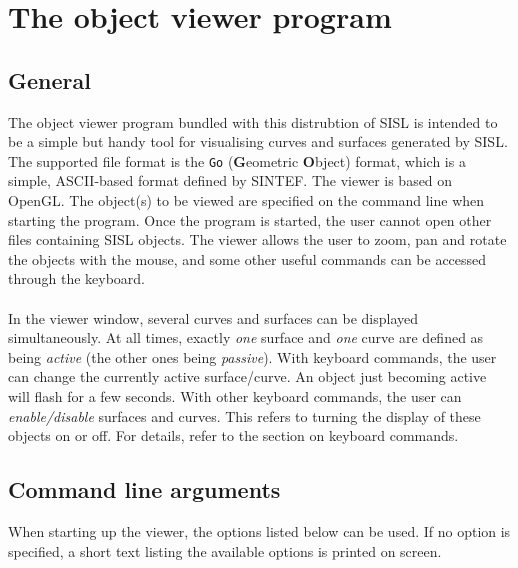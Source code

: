 \chapter{The object viewer program}

\section{General}
The object viewer program bundled with this distrubtion of SISL is intended to be
a simple but handy tool for visualising curves and surfaces generated by SISL.  The
supported file format is the \verb/Go/ (\textbf{G}eometric \textbf{O}bject) format, 
which is a simple, ASCII-based format defined by SINTEF.  The viewer is based on OpenGL. 
The object(s) to be viewed are specified on the command line when starting the 
program.  Once the program is started, the user cannot open other files containing
SISL objects.  The viewer allows the user to zoom, pan and rotate the objects with
the mouse, and some other useful commands can be accessed through the keyboard.
\\
\\
In the viewer window, several curves and surfaces can be displayed simultaneously.
At all times, exactly \emph{one} surface and \emph{one} curve are defined as being
\emph{active} (the other ones being \emph{passive}).  With keyboard commands, the user
can change the currently active surface/curve.  An object just becoming active will
flash for a few seconds.  With other keyboard commands, the user can \emph{enable/disable}
surfaces and curves.  This refers to turning the display of these objects on or off.
For details, refer to the section on keyboard commands.

\section{Command line arguments}
When starting up the viewer, the options listed below can be used.  If no option is
specified, a short text listing the available options is printed on screen.

